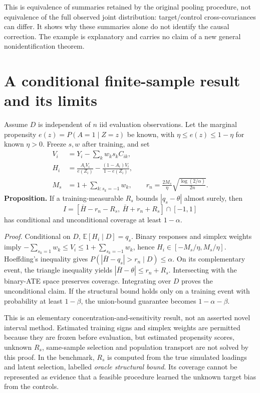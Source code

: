 \documentclass[11pt,a4paper]{article}
\newcommand{\E}{\mathbb E}
\begin{document}
This is equivalence of summaries retained by the original pooling procedure, not equivalence of the full observed joint distribution: target/control cross-covariances can differ. It shows why these summaries alone do not identify the causal correction. The example is explanatory and carries no claim of a new general nonidentification theorem.

\section{A conditional finite-sample result and its limits}

Assume $D$ is independent of $n$ iid evaluation observations. Let the marginal propensity $e(z)=P(A=1\mid Z=z)$ be known, with $\eta\le e(z)\le1-\eta$ for known $\eta>0$. Freeze $s,w$ after training, and set
\begin{align*}
 V_i&=Y_i-\sum_kw_ks_kC_{ik},\\
 H_i&=\frac{A_iV_i}{e(Z_i)}-\frac{(1-A_i)V_i}{1-e(Z_i)},\\
 M_s&=1+\sum_{k:s_k=-1}w_k,\qquad
 r_n=\frac{2M_s}{\eta}\sqrt{\frac{\log(2/\alpha)}{2n}}.
\end{align*}
\textbf{Proposition.} If a training-measurable $R_s$ bounds $|q_s-\theta|$ almost surely, then
\[
 I=[\bar H-r_n-R_s,\ \bar H+r_n+R_s]\cap[-1,1]
\]
has conditional and unconditional coverage at least $1-\alpha$.

\textit{Proof.} Conditional on $D$, $\E[H_i\mid D]=q_s$. Binary responses and simplex weights imply $-\sum_{s_k=1}w_k\le V_i\le1+\sum_{s_k=-1}w_k$, hence $H_i\in[-M_s/\eta,M_s/\eta]$. Hoeffding's inequality \cite{hoeffding} gives $P(|\bar H-q_s|>r_n\mid D)\le\alpha$. On its complementary event, the triangle inequality yields $|\bar H-\theta|\le r_n+R_s$. Intersecting with the binary-ATE space preserves coverage. Integrating over $D$ proves the unconditional claim. If the structural bound holds only on a training event with probability at least $1-\beta$, the union-bound guarantee becomes $1-\alpha-\beta$.

This is an elementary concentration-and-sensitivity result, not an asserted novel interval method. Estimated training signs and simplex weights are permitted because they are frozen before evaluation, but estimated propensity scores, unknown $R_s$, same-sample selection and population transport are not solved by this proof. In the benchmark, $R_s$ is computed from the true simulated loadings and latent selection, labelled \emph{oracle structural bound}. Its coverage cannot be represented as evidence that a feasible procedure learned the unknown target bias from the controls.
\end{document}
